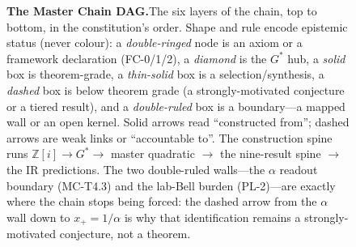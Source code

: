 \begin{figure}[p]
{}
  \caption[The Master Chain DAG]{\textbf{The Master Chain DAG.}\enspace The six
    layers of the chain, top to bottom, in the constitution's order. Shape and
    rule encode epistemic status (never colour): a \emph{double-ringed} node is
    an axiom or a framework declaration (FC-0/1/2), a \emph{diamond} is the
    $G^{*}$ hub, a \emph{solid} box is theorem-grade, a \emph{thin-solid} box is
    a selection/synthesis, a \emph{dashed} box is below theorem grade (a
    strongly-motivated conjecture or a tiered result), and a \emph{double-ruled}
    box is a boundary---a mapped wall or an open kernel. Solid arrows read
    ``constructed from''; dashed arrows are weak links or ``accountable to''.
    The construction spine runs $\mathbb{Z}[i]\to G^{*}\to$ master quadratic
    $\to$ the nine-result spine $\to$ the IR predictions. The two double-ruled
    walls---the $\alpha$ readout boundary (MC-T4.3) and the lab-Bell burden
    (PL-2)---are exactly where the chain stops being forced: the dashed arrow
    from the $\alpha$ wall down to $x_+=1/\alpha$ is why that identification
    remains a strongly-motivated conjecture, not a theorem.}
  \label{fig:masterdag}
\end{figure}
